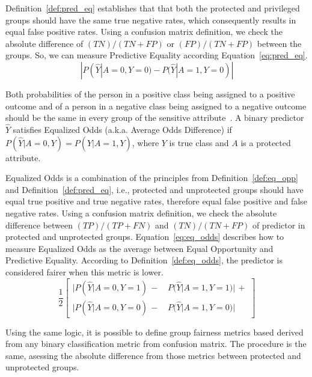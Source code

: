 Definition~\ref{def:pred_eq} establishes that that both the protected and privileged groups should have the same true negative rates, which consequently results in equal false positive rates. Using a confusion matrix definition, we check the absolute difference of $(TN)/(TN + FP)$ or $(FP)/(TN + FP)$ between the groups. So, we can measure Predictive Equality according Equation~\ref{eq:pred_eq}.
\begin{equation}\label{eq:pred_eq}
    |P(\hat{Y}|A=0,Y=0) - P(\hat{Y}|A=1,Y=0)|
\end{equation}

\begin{definition}\label{def:eq_odds}
Both probabilities of the person in a positive class being assigned to a positive outcome and of a person in a negative class being assigned to a negative outcome should be the same in every group of the sensitive attribute~\citep{Hardt2016}. A binary predictor $\hat{Y}$ satisfies Equalized Odds (a.k.a. Average Odds Difference) if $P(\hat{Y}|A=0,Y) = P(\hat{Y}|A=1,Y)$, where $Y$ is true class and $A$ is a protected attribute.
\end{definition}

Equalized Odds is a combination of the principles from Definition~\ref{def:eq_opp} and Definition~\ref{def:pred_eq}, i.e., protected and unprotected groups should have equal true positive and true negative rates, therefore equal false positive and false negative rates. Using a confusion matrix definition, we check the absolute difference between $(TP)/(TP + FN)$ and $(TN)/(TN + FP)$ of predictor in protected and unprotected groups. Equation~\ref{eq:eq_odds} describes how to measure Equalized Odds as the average between Equal Opportunity and Predictive Equality. According to Definition~\ref{def:eq_odds}, the predictor is considered fairer when this metric is lower.
\begin{equation}\label{eq:eq_odds}
    \frac{1}{2}\left[
    \begin{aligned}
    |P(\hat{Y}|A=0,Y=1)\,-\,&P(\hat{Y}|A=1,Y=1)| \, +\\
    |P(\hat{Y}|A=0,Y=0)\,-\,&P(\hat{Y}|A=1,Y=0)|
    \end{aligned}
    \right]
\end{equation}

Using the same logic, it is possible to define group fairness metrics based derived from any binary classification metric from confusion matrix. The procedure is the same, asessing the absolute difference from those metrics between protected and unprotected groups.

